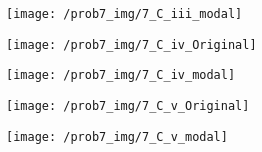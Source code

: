 \begin{figure}[h]
  \centering
  \texttt{[image: /prob7\_img/7\_C\_iii\_modal]}

\end{figure}

\begin{figure}[h]
  \centering
  \texttt{[image: /prob7\_img/7\_C\_iv\_Original]}
\end{figure}

\begin{figure}[h]
  \centering
  \texttt{[image: /prob7\_img/7\_C\_iv\_modal]}

\end{figure}

\begin{figure}[h]
  \centering
  \texttt{[image: /prob7\_img/7\_C\_v\_Original]}
\end{figure}

\begin{figure}[h]
  \centering
  \texttt{[image: /prob7\_img/7\_C\_v\_modal]}

\end{figure}
